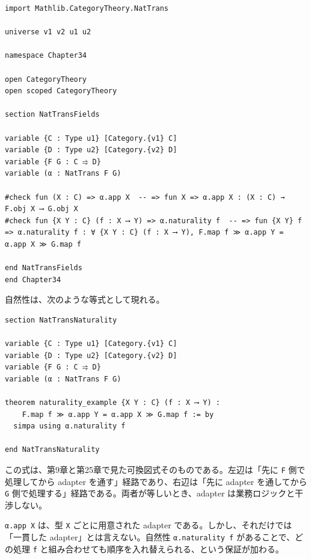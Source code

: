 \begin{listing}[htbp]
\begin{verbatim}
import Mathlib.CategoryTheory.NatTrans

universe v1 v2 u1 u2

namespace Chapter34

open CategoryTheory
open scoped CategoryTheory

section NatTransFields

variable {C : Type u1} [Category.{v1} C]
variable {D : Type u2} [Category.{v2} D]
variable {F G : C ⥤ D}
variable (α : NatTrans F G)

#check fun (X : C) => α.app X  -- => fun X => α.app X : (X : C) → F.obj X ⟶ G.obj X
#check fun {X Y : C} (f : X ⟶ Y) => α.naturality f  -- => fun {X Y} f => α.naturality f : ∀ {X Y : C} (f : X ⟶ Y), F.map f ≫ α.app Y = α.app X ≫ G.map f

end NatTransFields
end Chapter34
\end{verbatim}
\caption{NatTrans の app と naturality を読む}
\label{lst:ch34_nattrans_basic}
\end{listing}

自然性は、次のような等式として現れる。

\begin{listing}[htbp]
\begin{verbatim}
section NatTransNaturality

variable {C : Type u1} [Category.{v1} C]
variable {D : Type u2} [Category.{v2} D]
variable {F G : C ⥤ D}
variable (α : NatTrans F G)

theorem naturality_example {X Y : C} (f : X ⟶ Y) :
    F.map f ≫ α.app Y = α.app X ≫ G.map f := by
  simpa using α.naturality f

end NatTransNaturality
\end{verbatim}
\caption{自然性の四角形を等式として使う}
\label{lst:ch34_nattrans_naturality}
\end{listing}

この式は、第9章と第25章で見た可換図式そのものである。左辺は「先に \texttt{F} 側で処理してから adapter を通す」経路であり、右辺は「先に adapter を通してから \texttt{G} 側で処理する」経路である。両者が等しいとき、adapter は業務ロジックと干渉しない。

\begin{intuitionbox}
\texttt{α.app X} は、型 \texttt{X} ごとに用意された adapter である。しかし、それだけでは「一貫した adapter」とは言えない。自然性 \texttt{α.naturality f} があることで、どの処理 \texttt{f} と組み合わせても順序を入れ替えられる、という保証が加わる。
\end{intuitionbox}

